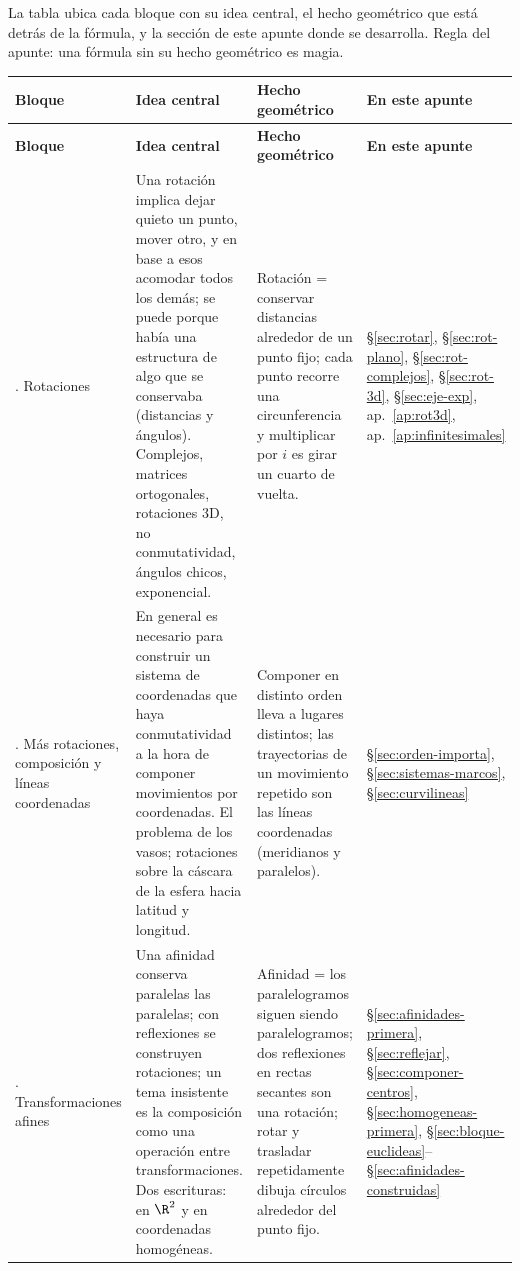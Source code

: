 La tabla ubica cada bloque con su idea central, el hecho geométrico que está detrás de la fórmula, y la sección de este apunte donde se
desarrolla. Regla del apunte: una fórmula sin su hecho geométrico es magia.

{\small
\begin{longtable}{>{\raggedright\arraybackslash}p{20mm}>{\raggedright\arraybackslash}p{60mm}>{\raggedright\arraybackslash}p{44mm}>{\raggedright\arraybackslash}p{28mm}}
\toprule
\textbf{Bloque} & \textbf{Idea central} & \textbf{Hecho geométrico} &
\textbf{En este apunte}\\
\midrule
\endfirsthead
\toprule
\textbf{Bloque} & \textbf{Idea central} & \textbf{Hecho geométrico} &
\textbf{En este apunte}\\
\midrule
\endhead
\bottomrule
\endlastfoot
1. Rotaciones &
Una rotación implica dejar quieto un punto, mover otro, y en base a esos acomodar todos
los demás; se puede porque había una estructura de algo que se conservaba (distancias y
ángulos). Complejos, matrices ortogonales, rotaciones 3D, no conmutatividad, ángulos
chicos, exponencial. &
Rotación = conservar distancias alrededor de un punto fijo; cada punto recorre una
circunferencia y multiplicar por \(i\) es girar un cuarto de vuelta. &
\S\ref{sec:rotar}, \S\ref{sec:rot-plano}, \S\ref{sec:rot-complejos}, \S\ref{sec:rot-3d},
\S\ref{sec:eje-exp}, ap.~\ref{ap:rot3d}, ap.~\ref{ap:infinitesimales}\\
2. Más rotaciones, composición y líneas coordenadas &
En general es necesario para construir un sistema de coordenadas que haya conmutatividad
a la hora de componer movimientos por coordenadas. El problema de los vasos; rotaciones
sobre la cáscara de la esfera hacia latitud y longitud. &
Componer en distinto orden lleva a lugares distintos; las trayectorias de un movimiento
repetido son las líneas coordenadas (meridianos y paralelos). &
\S\ref{sec:orden-importa}, \S\ref{sec:sistemas-marcos}, \S\ref{sec:curvilineas}\\
3. Transformaciones afines &
Una afinidad conserva paralelas las paralelas; con reflexiones se construyen
rotaciones; un tema insistente es la composición como una operación entre
transformaciones. Dos escrituras: en \(\R^2\) y en coordenadas homogéneas. &
Afinidad = los paralelogramos siguen siendo paralelogramos; dos reflexiones en rectas
secantes son una rotación; rotar y trasladar repetidamente dibuja círculos alrededor del
punto fijo. &
\S\ref{sec:afinidades-primera}, \S\ref{sec:reflejar}, \S\ref{sec:componer-centros},
\S\ref{sec:homogeneas-primera}, \S\ref{sec:bloque-euclideas}--\S\ref{sec:afinidades-construidas}\\

\end{longtable}}
